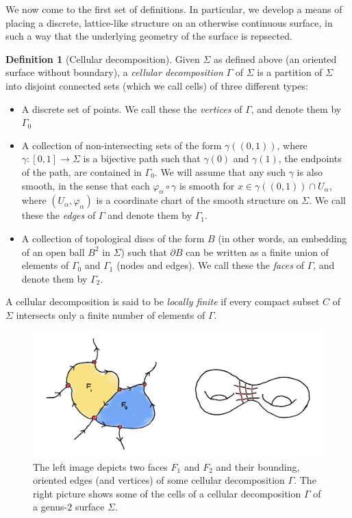 \documentclass[aps,pra,showpacs,notitlepage,onecolumn,superscriptaddress,nofootinbib]{revtex4-1}
\theoremstyle{definition}
\newtheorem{definition}{Definition}[section]
\begin{document}
\noindent We now come to the first set of definitions. In particular, we develop a means of placing a discrete, lattice-like structure on an otherwise continuous surface,
in such a way that the underlying geometry of the surface is repsected.

\begin{definition}[Cellular decomposition]
  Given $\Sigma$ as defined above (an oriented surface without boundary), a \emph{cellular decomposition} $\Gamma$ of $\Sigma$ is a partition of $\Sigma$ into disjoint connected
  sets (which we call cells) of three different types:
  \begin{itemize}
  \item A discrete set of points. We call these the \emph{vertices} of $\Gamma$, and denote them by $\Gamma_0$
  \item A collection of non-intersecting sets of the form $\gamma((0, 1))$, where $\gamma : [0, 1] \rightarrow \Sigma$ is a bijective path such that $\gamma(0)$ and $\gamma(1)$, the endpoints of the path, are contained
    in $\Gamma_0$. We will assume that any such $\gamma$ is also smooth, in the sense that each $\varphi_{\alpha} \circ \gamma$ is smooth for $x \in \gamma((0, 1)) \cap U_{\alpha}$, where $(U_{\alpha}, \varphi_{\alpha})$ is a coordinate chart
    of the smooth structure on $\Sigma$. We call these the \emph{edges} of $\Gamma$ and denote them by $\Gamma_1$.
  \item A collection of topological discs of the form $B$ (in other words, an embedding of an open ball $B^2$ in $\Sigma$)
    such that $\partial B$ can be written as a finite union of elements of $\Gamma_0$ and $\Gamma_1$ (nodes and edges). We call these the \emph{faces} of $\Gamma$, and denote them by $\Gamma_2$.
  \end{itemize}
  A cellular decomposition is said to be \emph{locally finite} if every compact subset $C$ of $\Sigma$ intersects only a finite number of elements of $\Gamma$.
\end{definition}

\begin{center}
  \begin{figure}
    \includegraphics[width=400pt]{./assets/mercat1.jpeg}
    \caption{The left image depicts two faces $F_1$ and $F_2$ and their bounding, oriented edges (and vertices) of some cellular decomposition $\Gamma$. The right picture shows
    some of the cells of a cellular decomposition $\Gamma$ of a genus-$2$ surface $\Sigma$.}
    \end{figure}
  \end{center}
\end{document}

